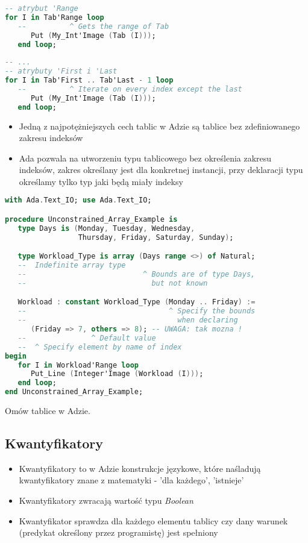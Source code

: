 \documentclass[a4paper,15pt]{article}
\newcommand{\ask}[2]{
    \begin{tcolorbox}[colback=black!5!white,colframe=gray,title={Pytanie #1}]
        #2
    \end{tcolorbox}
}
\begin{document}
\begin{lstlisting}[language=Ada, caption=Atrybuty tablic]
-- atrybut 'Range
for I in Tab'Range loop
   --          ^ Gets the range of Tab
      Put (My_Int'Image (Tab (I)));
   end loop;
   
-- ...
-- atrybuty 'First i 'Last
for I in Tab'First .. Tab'Last - 1 loop
   --          ^ Iterate on every index except the last
      Put (My_Int'Image (Tab (I)));
   end loop;
\end{lstlisting}


\begin{itemize}
\item Jedną z najpotężniejszych cech tablic w Adzie są tablice bez zdefiniowanego zakresu indeksów
\item Ada pozwala na utworzeniu typu tablicowego bez określenia zakresu indeksów, zakres określany jest dla konkretnej instancji, przy deklaracji typu określamy tylko typ jaki będą miały indeksy
\end{itemize}

\begin{lstlisting}[language=Ada, caption=Tablice bez okreslonych ograniczen]
with Ada.Text_IO; use Ada.Text_IO;

procedure Unconstrained_Array_Example is
   type Days is (Monday, Tuesday, Wednesday,
                 Thursday, Friday, Saturday, Sunday);

   type Workload_Type is array (Days range <>) of Natural;
   --  Indefinite array type
   --                           ^ Bounds are of type Days,
   --                             but not known

   Workload : constant Workload_Type (Monday .. Friday) :=
   --                                 ^ Specify the bounds
   --                                   when declaring
      (Friday => 7, others => 8); -- UWAGA: tak mozna ! 
   --               ^ Default value
   --  ^ Specify element by name of index
begin
   for I in Workload'Range loop
      Put_Line (Integer'Image (Workload (I)));
   end loop;
end Unconstrained_Array_Example;
\end{lstlisting}

\ask{}{
Omów tablice w Adzie.
}

\subsection{Kwantyfikatory}

\begin{itemize}
\item Kwantyfikatory to w Adzie konstrukcje językowe, które naśladują kwantyfikatory znane z matematyki - 'dla każdego', 'istnieje'
\item Kwantyfikatory zwracają wartość typu \textit{Boolean}
\item Kwantyfikator sprawdza dla każdego elementu tablicy czy dany warunek (predykat określony przez programistę) jest spełniony
\end{itemize}
\end{document}

